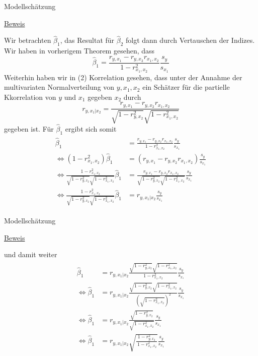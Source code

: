 \documentclass[
  8pt,
  ignorenonframetext,
]{beamer}
\begin{document}
\begin{frame}{Modellschätzung}
\protect\hypertarget{modellschuxe4tzung-17}{}
\footnotesize

\underline{Beweis}

Wir betrachten \(\hat{\beta}_1\), das Resultat für \(\hat{\beta}_2\)
folgt dann durch Vertauschen der Indizes. Wir haben in vorherigem
Theorem gesehen, dass \begin{equation}
\hat{\beta}_1 = \frac{r_{y,x_1} - r_{y,x_2}r_{x_1,x_2}}{1 - r_{x_1,x_2}^2} \frac{s_{y}}{s_{x_1}}
\end{equation} Weiterhin haben wir in (2) Korrelation gesehen, dass
unter der Annahme der multivariaten Normalverteilung von \(y,x_1,x_2\)
ein Schätzer für die partielle Kkorrelation von \(y\) und \(x_1\)
gegeben \(x_2\) durch \begin{equation}
r_{y,x_1|x_2} = \frac{r_{y,x_1} - r_{y,x_2}r_{x_1,x_2}}{\sqrt{1 - r^2_{y,x_2}}\sqrt{1 - r_{x_1,x_2}^2}}
\end{equation} gegeben ist. Für \(\hat{\beta}_1\) ergibt sich somit
\tiny \begin{align}
\begin{split}
\hat{\beta}_1
& = \frac{r_{y,x_1} - r_{y,x_2}r_{x_1,x_2}}{1 - r_{x_1,x_2}^2} \frac{s_{y}}{s_{x_1}}
\\
\Leftrightarrow
\left(1 - r_{x_1,x_2}^2\right)\hat{\beta}_1
& = (r_{y,x_1} - r_{y,x_2}r_{x_1,x_2}) \frac{s_{y}}{s_{x_1}}
\\
\Leftrightarrow
\frac{1 - r_{x_1,x_2}^2}{\sqrt{1 - r^2_{y,x_2}}\sqrt{1 - r_{x_1,x_2}^2}}\hat{\beta}_1
& = \frac{r_{y,x_1} - r_{y,x_2}r_{x_1,x_2}}{\sqrt{1 - r^2_{y,x_2}}\sqrt{1-r_{x_1,x_2}^2}} \frac{s_{y}}{s_{x_1}}
\\
\Leftrightarrow
\frac{1 - r_{x_1,x_2}^2}{\sqrt{1 - r^2_{y,x_2}}\sqrt{1 - r_{x_1,x_2}^2}}\hat{\beta}_1
& = r_{y,x_1|x_2}\frac{s_{y}}{s_{x_1}}
\end{split}
\end{align}
\end{frame}

\begin{frame}{Modellschätzung}
\protect\hypertarget{modellschuxe4tzung-18}{}
\footnotesize

\underline{Beweis}

und damit weiter \begin{align}
\begin{split}
\hat{\beta}_1
& = r_{y,x_1|x_2}\frac{\sqrt{1 - r^2_{y,x_2}}\sqrt{1 - r_{x_1,x_2}^2}}{1 - r_{x_1,x_2}^2}\frac{s_{y}}{s_{x_1}}
\\
\Leftrightarrow
\hat{\beta}_1
& = r_{y,x_1|x_2}\frac{\sqrt{1 - r^2_{y,x_2}}\sqrt{1 - r_{x_1,x_2}^2}}{\left(\sqrt{1 - r_{x_1,x_2}^2}\right)^2}\frac{s_{y}}{s_{x_1}}
\\
\Leftrightarrow
\hat{\beta}_1
& = r_{y,x_1|x_2}\frac{\sqrt{1 - r^2_{y,x_2}}}{\sqrt{1 - r_{x_1,x_2}^2}}\frac{s_{y}}{s_{x_1}}
\\
\Leftrightarrow
\hat{\beta}_1
& = r_{y,x_1|x_2}\sqrt{\frac{1 - r^2_{y,x_2}}{\,1 - r_{x_1,x_2}^2}}\frac{s_{y}}{s_{x_1}}
\end{split}
\end{align}
\end{frame}
\end{document}
